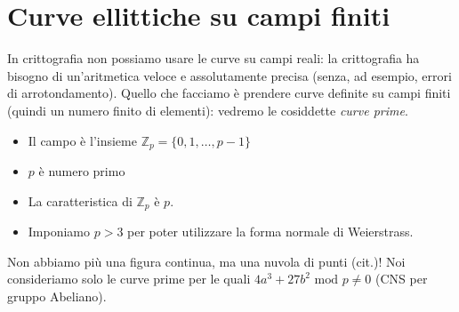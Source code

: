 \section{Curve ellittiche su campi finiti}
In crittografia non possiamo usare le curve su campi reali: la crittografia ha bisogno di un'aritmetica veloce e assolutamente precisa (senza, ad esempio, errori di arrotondamento). Quello che facciamo è prendere curve definite su campi finiti (quindi un numero finito di elementi): vedremo le cosiddette \emph{curve prime}. 
\begin{itemize}
	\item Il campo è l'insieme $\mathbb{Z}_p=\{0,1,\dots,p-1\}$
	\item $p$ è numero primo
	\item La caratteristica di $\mathbb{Z}_p$ è $p$. 
	\item Imponiamo $p>3$ per poter utilizzare la forma normale di Weierstrass.
\end{itemize}
Non abbiamo più una figura continua, ma una nuvola di punti (cit.)! Noi consideriamo solo le curve prime per le quali $4a^3 + 27b^2 \text{ mod } p \neq 0$ (CNS per gruppo Abeliano).
